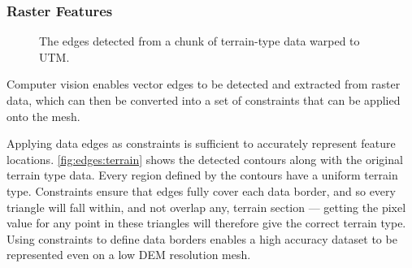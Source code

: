 \documentclass[12pt]{article}
\begin{document}
\subsubsection{Raster Features}

\begin{figure}[H]
  \centering
  \caption{The edges detected from a chunk of terrain-type data warped to UTM.}\label{fig:edges:terrain}
\end{figure}

Computer vision enables vector edges to be detected and extracted from raster data, which can then be converted into a set of constraints that can be applied onto the mesh.

Applying data edges as constraints is sufficient to accurately represent feature locations. \autoref{fig:edges:terrain} shows the detected contours along with the original terrain type data. Every region defined by the contours have a uniform terrain type. Constraints ensure that edges fully cover each data border, and so every triangle will fall within, and not overlap any, terrain section --- getting the pixel value for any point in these triangles will therefore give the correct terrain type. Using constraints to define data borders enables a high accuracy dataset to be represented even on a low DEM resolution mesh.
\end{document}
